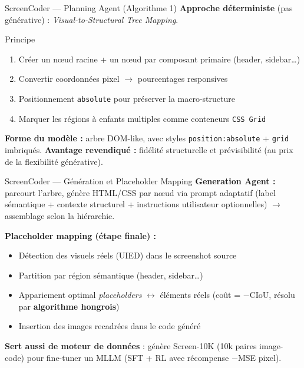 \documentclass[10pt,aspectratio=169]{beamer}
\begin{document}
\begin{frame}{ScreenCoder --- Planning Agent (Algorithme 1)}
\textbf{Approche déterministe} (pas générative) : \emph{Visual-to-Structural Tree Mapping}.

\begin{block}{Principe}
\begin{enumerate}
  \item Créer un n\oe ud racine + un n\oe ud par composant primaire (header, sidebar\ldots)
  \item Convertir coordonnées pixel $\to$ pourcentages responsives
  \item Positionnement \texttt{absolute} pour préserver la macro-structure
  \item Marquer les régions à enfants multiples comme conteneurs \texttt{CSS Grid}
\end{enumerate}
\end{block}

\textbf{Forme du modèle :} arbre DOM-like, avec styles \texttt{position:absolute} + \texttt{grid} imbriqués.
\textbf{Avantage revendiqué :} fidélité structurelle et prévisibilité (au prix de la flexibilité générative).
\end{frame}

\begin{frame}{ScreenCoder --- Génération et Placeholder Mapping}
\textbf{Generation Agent :} parcourt l'arbre, génère HTML/CSS par n\oe ud via prompt adaptatif (label sémantique + contexte structurel + instructions utilisateur optionnelles) $\to$ assemblage selon la hiérarchie.

\textbf{Placeholder mapping (étape finale) :}
\begin{itemize}
  \item Détection des visuels réels (UIED) dans le screenshot source
  \item Partition par région sémantique (header, sidebar\ldots)
  \item Appariement optimal \emph{placeholders} $\leftrightarrow$ éléments réels (coût = $-$CIoU, résolu par \textbf{algorithme hongrois})
  \item Insertion des images recadrées dans le code généré
\end{itemize}
\textbf{Sert aussi de moteur de données} : génère Screen-10K (10k paires image-code) pour fine-tuner un MLLM (SFT + RL avec récompense $-$MSE pixel).
\end{frame}

\end{document}
